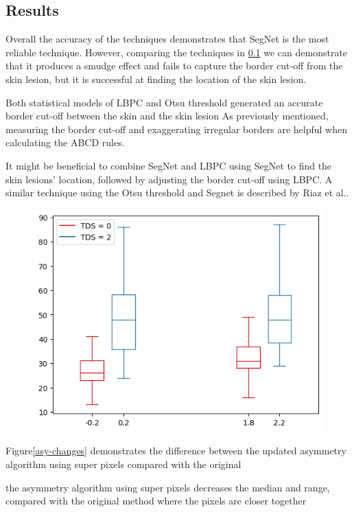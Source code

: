 \subsection{Results}
Overall the accuracy of the techniques demonstrates that SegNet is the most reliable technique. However, comparing the techniques in \ref{} we can demonstrate that it produces a smudge effect and fails to capture the border cut-off from the skin lesion, but it is successful at finding the location of the skin lesion.

Both statistical models of LBPC and Otsu threshold generated an accurate border cut-off between the skin and the skin lesion As previously mentioned, measuring the border cut-off and exaggerating irregular borders are helpful when calculating the ABCD rules. 

It might be beneficial to combine SegNet and LBPC using SegNet to find the skin lesions' location, followed by adjusting the border cut-off using LBPC. A similar technique using the Otsu threshold and Segnet is described by Riaz et al.\cite{Riaz2019}.

\begin{figure}
    \centering
    \includegraphics[scale=1.2]{images/asymmetry/asy-changes.png}
    \caption{} 
\end{figure}\label{asy-changes}

Figure\ref{asy-changes} demonstrates the difference between the updated asymmetry algorithm using super pixels compared with the original


the asymmetry algorithm using super pixels decreases the median and range, compared with the original method where the pixels are closer together


